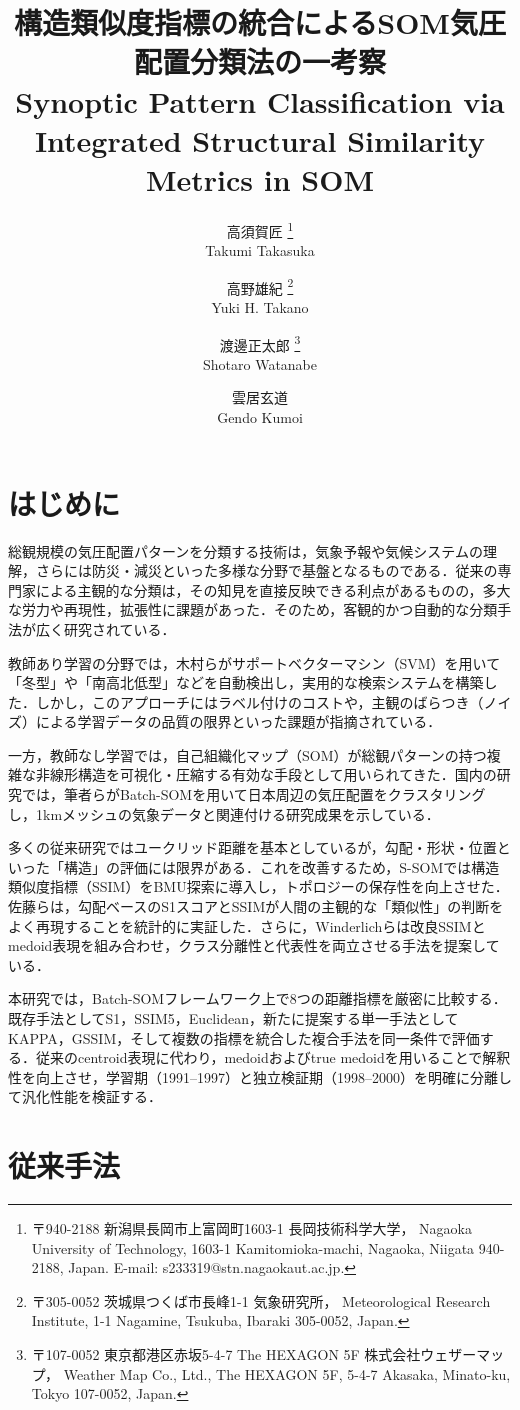 \documentclass{jarticle}
\title{
  構造類似度指標の統合によるSOM気圧配置分類法の一考察\\
  Synoptic Pattern Classification via Integrated Structural Similarity Metrics in SOM
}
\author{
  高須賀匠
  \thanks{ %
    〒940-2188 新潟県長岡市上富岡町1603-1 長岡技術科学大学，
    Nagaoka University of Technology, 1603-1 Kamitomioka-machi, Nagaoka, Niigata 940-2188, Japan. E-mail: s233319@stn.nagaokaut.ac.jp.
  }\\
  Takumi Takasuka
  \and
  高野雄紀
  \thanks{
    〒305-0052 茨城県つくば市長峰1-1 気象研究所，
    Meteorological Research Institute, 1-1 Nagamine, Tsukuba, Ibaraki 305-0052, Japan.
  }\\
  Yuki H. Takano
  \and
  渡邊正太郎
  \thanks {
    〒107-0052 東京都港区赤坂5-4-7 The HEXAGON 5F 株式会社ウェザーマップ，
    Weather Map Co., Ltd., The HEXAGON 5F, 5-4-7 Akasaka, Minato-ku, Tokyo 107-0052, Japan.
  }\\
  Shotaro Watanabe
  \and
  雲居玄道
  \footnotemark[1]\\
  Gendo Kumoi
}
\theoremstyle{definition}
\begin{document}
\maketitle

\section{はじめに}
総観規模の気圧配置パターンを分類する技術は，気象予報や気候システムの理解，さらには防災・減災といった多様な分野で基盤となるものである．従来の専門家による主観的な分類は，その知見を直接反映できる利点があるものの，多大な労力や再現性，拡張性に課題があった．そのため，客観的かつ自動的な分類手法が広く研究されている．

教師あり学習の分野では，木村ら\cite{木村広希2009サポートベクターマシンを用いた気圧配置検出手法の提案}がサポートベクターマシン（SVM）を用いて「冬型」や「南高北低型」などを自動検出し，実用的な検索システムを構築した．しかし，このアプローチにはラベル付けのコストや，主観のばらつき（ノイズ）による学習データの品質の限界といった課題が指摘されている．

一方，教師なし学習では，自己組織化マップ（SOM）が総観パターンの持つ複雑な非線形構造を可視化・圧縮する有効な手段として用いられてきた\cite{philippopoulos2014performance,jiang2013classification}．国内の研究では，筆者ら\cite{takasuka2024}がBatch-SOMを用いて日本周辺の気圧配置をクラスタリングし，1kmメッシュの気象データと関連付ける研究成果を示している．

多くの従来研究ではユークリッド距離を基本としているが，勾配・形状・位置といった「構造」の評価には限界がある．これを改善するため，S-SOM\cite{doan2021s}では構造類似度指標（SSIM）をBMU探索に導入し，トポロジーの保存性を向上させた．佐藤らは，勾配ベースのS1スコアとSSIMが人間の主観的な「類似性」の判断をよく再現することを統計的に実証した\cite{SATOTakuto20212021-047}．さらに，Winderlichらは改良SSIMとmedoid表現を組み合わせ，クラス分離性と代表性を両立させる手法を提案している\cite{winderlich2024classification}．

本研究では，Batch-SOMフレームワーク上で8つの距離指標を厳密に比較する．既存手法としてS1，SSIM5，Euclidean，新たに提案する単一手法としてKAPPA，GSSIM，そして複数の指標を統合した複合手法を同一条件で評価する．従来のcentroid表現に代わり，medoidおよびtrue medoidを用いることで解釈性を向上させ，学習期（1991–1997）と独立検証期（1998–2000）を明確に分離して汎化性能を検証する．

\section{従来手法}
\end{document}
